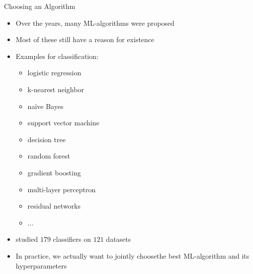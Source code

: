 \begin{frame}[c]{Choosing an Algorithm}

\begin{itemize}
	\item Over the years, many ML-algorithms were proposed
	\pause
	\item Most of these still have a reason for existence
	\pause
	\item Examples for classification:
	\begin{itemize}
		\item logistic regression
		\item k-nearest neighbor
		\item na\"ive Bayes
		\item support vector machine
		\item decision tree
		\item random forest
		\item gradient boosting
		\item multi-layer perceptron
		\item residual networks
		\item ...
	\end{itemize}
	\pause
	\item {} studied $179$ classifiers on $121$ datasets
	\pause
	\item In practice, we actually want to jointly choose\newline the best ML-algorithm and its hyperparameters
\end{itemize}


\end{frame}
